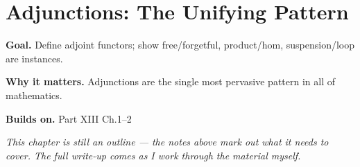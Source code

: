 \chapter{Adjunctions: The Unifying Pattern}
\label{ch:13-category-theory-and-universal-structures-03}

\begin{chapterintro}
\textbf{Goal.} Define adjoint functors; show free/forgetful, product/hom, suspension/loop are instances.

\textbf{Why it matters.} Adjunctions are the single most pervasive pattern in all of mathematics.

\textbf{Builds on.} Part XIII Ch.1–2
\end{chapterintro}

\textit{This chapter is still an outline --- the notes above mark out what it needs to cover. The full write-up comes as I work through the material myself.}
